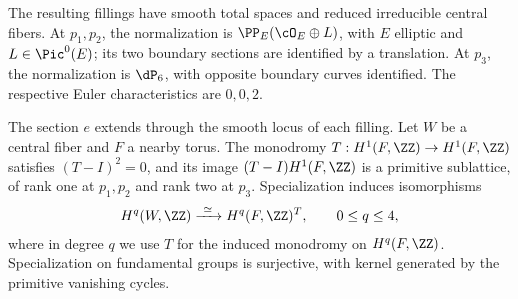 \begin{proposition}\label{mum}
The resulting fillings have smooth total spaces and reduced irreducible
central fibers. At $p_1,p_2$, the normalization is
$\PP_E(\cO_E\oplus L)$, with $E$ elliptic and $L\in\Pic^0(E)$; its two
boundary sections are identified by a translation. At $p_3$, the
normalization is $\dP_6$, with opposite boundary curves identified.
The respective Euler characteristics are $0,0,2$.

The section $e$ extends through the smooth locus of each filling.
Let $W$ be a central fiber and $F$ a nearby torus. The monodromy
$T:H^1(F,\ZZ)\to H^1(F,\ZZ)$ satisfies $(T-I)^2=0$, and its image
$(T-I)H^1(F,\ZZ)$ is a primitive sublattice, of rank one at
$p_1,p_2$ and rank two at $p_3$. Specialization induces isomorphisms
\begin{align}\label{sp}
 H^q(W,\ZZ)\xrightarrow{\ \simeq\ }H^q(F,\ZZ)^T,
 \qquad 0\leq q\leq4,
\end{align}
where in degree $q$ we use $T$ for the induced monodromy on
$H^q(F,\ZZ)$. Specialization on fundamental groups is surjective, with kernel
generated by the primitive vanishing cycles.
\end{proposition}
